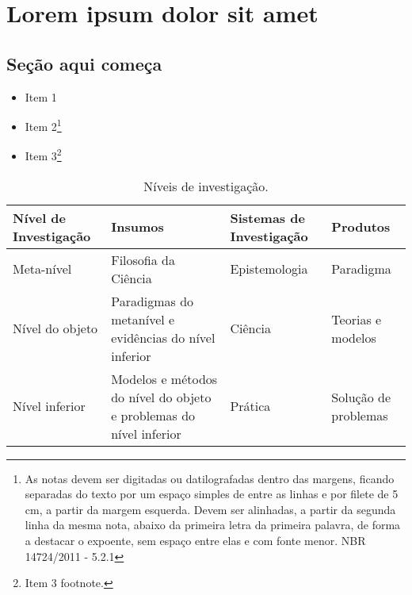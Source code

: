 \documentclass[12pt,openright,twoside,a4paper]{abntex2}
\begin{document}
\chapter{Lorem ipsum dolor sit amet}

\section{Seção aqui começa}

\lipsum[3]

\begin{itemize}
  \item Item 1
  \item Item 2\footnote{As notas devem ser digitadas ou datilografadas dentro
  das margens, ficando separadas do texto por um espaço simples de entre as
  linhas e por filete de 5 cm, a partir da margem esquerda. Devem ser
  alinhadas, a partir da segunda linha da mesma nota, abaixo da primeira letra
  da primeira palavra, de forma a destacar o expoente, sem espaço entre elas e
  com fonte menor. NBR 14724/2011 - 5.2.1}
  \item Item 3\footnote{Item 3 footnote.}
\end{itemize}


\lipsum[4]

\begin{table}[htb]
\footnotesize
\caption[Níveis de investigação]{\footnotesize{Níveis de investigação.
\cite{van86}}}
\label{tab-nivinv}
\begin{tabular}{p{2.6cm}|p{6.0cm}|p{2.25cm}|p{3.40cm}}
   \textbf{Nível de Investigação} & \textbf{Insumos}  & \textbf{Sistemas de Investigação}  & \textbf{Produtos}  \\
    \hline
    Meta-nível & Filosofia\index{Filosofia} da Ciência  & Epistemologia &
    Paradigma  \\
    \hline
    Nível do objeto & Paradigmas do metanível e evidências do nível inferior &
    Ciência  & Teorias e modelos \\
    \hline
    Nível inferior & Modelos e métodos do nível do objeto e problemas do nível inferior & Prática & Solução de problemas  \\
\end{tabular}
\end{table}
\end{document}
